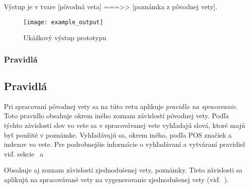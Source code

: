 Výstup je v tvare [pôvodná veta] ===>> [poznámka z pôvodnej vety].

\begin{figure}[H]
\begin{center}\texttt{[image: example\_output]}\end{center}
\caption[Ukážkový výstup prototypu]{Ukážkový výstup prototypu}\label{fig:example_output}
\end{figure}

%
%
{
	\subsubsection{Pravidlá}
}
{
	\subsection{Pravidlá}
}
\label{subsubsec:notenizer_pravidla}
Pri spracovaní pôvodnej vety sa na túto vetu aplikuje \textit{pravidlo na spracovanie}. Toto pravidlo obsahuje okrem iného zoznam závislostí pôvodnej vety. Podľa týchto závislostí slov vo vete sa v spracovávanej vete vyhľadajú slová, ktoré majú byť použité v poznámke. Vyhľadávajú sa, okrem iného, podľa POS značiek a indexov vo vete. Pre podrobnejšie informácie o vyhľadávaní a vytváraní pravidiel viď. sekcie~ a~

Obsahuje aj zoznam závislostí zjednodušenej vety, poznámky. Tieto závislosti sa aplikujú na spracovávané vety na vygenerovanie zjednodušenej vety (viď.~).